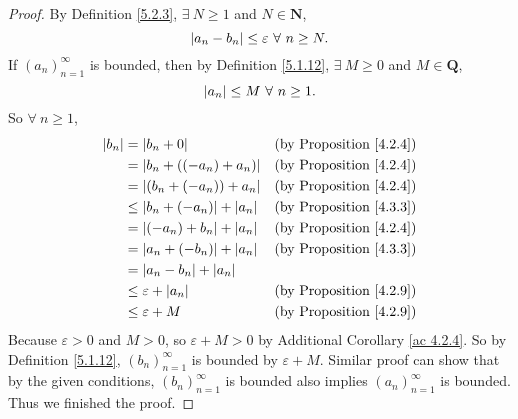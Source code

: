 \begin{proof}
By Definition \ref{5.2.3}, \(\exists\ N \geq 1\) and \(N \in \mathbf{N}\),
\[
    \abs*{a_n - b_n} \leq \varepsilon \ \forall\ n \geq N.
\]
If \((a_n)_{n = 1}^{\infty}\) is bounded, then by Definition \ref{5.1.12}, \(\exists\ M \geq 0\) and \(M \in \mathbf{Q}\),
\[
    \abs*{a_n} \leq M \ \forall\ n \geq 1.
\]
So \(\forall\ n \geq 1\),
\begin{align*}
\abs*{b_n} &= \abs*{b_n + 0} & \text{(by Proposition \ref{4.2.4})} \\
&= \abs*{b_n + ((-a_n) + a_n)} & \text{(by Proposition \ref{4.2.4})} \\
&= \abs*{(b_n + (-a_n)) + a_n} & \text{(by Proposition \ref{4.2.4})} \\
&\leq \abs*{b_n + (-a_n)} + \abs*{a_n} & \text{(by Proposition \ref{4.3.3})} \\
&= \abs*{(-a_n) + b_n} + \abs*{a_n} & \text{(by Proposition \ref{4.2.4})} \\
&= \abs*{a_n + (-b_n)} + \abs*{a_n} & \text{(by Proposition \ref{4.3.3})} \\
&= \abs*{a_n - b_n} + \abs*{a_n} \\
&\leq \varepsilon + \abs*{a_n} & \text{(by Proposition \ref{4.2.9})} \\
&\leq \varepsilon + M & \text{(by Proposition \ref{4.2.9})} \\
\end{align*}
Because \(\varepsilon > 0\) and \(M > 0\), so \(\varepsilon + M > 0\) by Additional Corollary \ref{ac 4.2.4}.
So by Definition \ref{5.1.12}, \((b_n)_{n = 1}^{\infty}\) is bounded by \(\varepsilon + M\).
Similar proof can show that by the given conditions, \((b_n)_{n = 1}^{\infty}\) is bounded also implies \((a_n)_{n = 1}^{\infty}\) is bounded.
Thus we finished the proof.
\end{proof}
